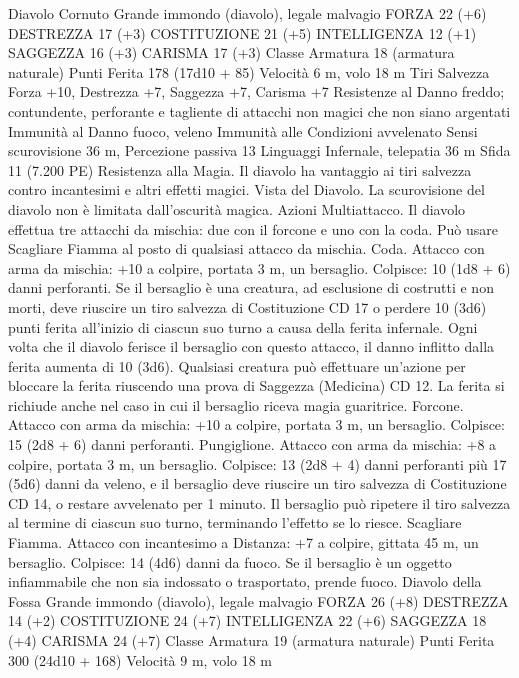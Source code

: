 \begin{multicols}{2}
Diavolo Cornuto
Grande immondo (diavolo), legale malvagio
FORZA 22 (+6)
DESTREZZA 17 (+3)
COSTITUZIONE 21 (+5)
INTELLIGENZA 12 (+1)
SAGGEZZA 16 (+3)
CARISMA 17 (+3)
Classe Armatura 18 (armatura naturale)
Punti Ferita 178 (17d10 + 85)
Velocità 6 m, volo 18 m
Tiri Salvezza Forza +10, Destrezza +7, Saggezza +7, Carisma
+7
Resistenze al Danno freddo; contundente, perforante e tagliente
di attacchi non magici che non siano argentati
Immunità al Danno fuoco, veleno
Immunità alle Condizioni avvelenato
Sensi scurovisione 36 m, Percezione passiva 13
Linguaggi Infernale, telepatia 36 m
Sfida 11 (7.200 PE)
Resistenza alla Magia. Il diavolo ha vantaggio ai tiri salvezza
contro incantesimi e altri effetti magici.
Vista del Diavolo. La scurovisione del diavolo non è limitata
dall’oscurità magica.
Azioni
Multiattacco. Il diavolo effettua tre attacchi da mischia: due con
il forcone e uno con la coda. Può usare Scagliare Fiamma al
posto di qualsiasi attacco da mischia.
Coda. Attacco con arma da mischia: +10 a colpire, portata 3 m,
un bersaglio.
Colpisce: 10 (1d8 + 6) danni perforanti. Se il bersaglio è una
creatura, ad esclusione di costrutti e non morti, deve riuscire un
tiro salvezza di Costituzione CD 17 o perdere 10 (3d6) punti
ferita all’inizio di ciascun suo turno a causa della ferita infernale.
Ogni volta che il diavolo ferisce il bersaglio con questo attacco,
il danno inflitto dalla ferita aumenta di 10 (3d6). Qualsiasi
creatura può effettuare un’azione per bloccare la ferita riuscendo
una prova di Saggezza (Medicina) CD 12. La ferita si richiude
anche nel caso in cui il bersaglio riceva magia guaritrice.
Forcone. Attacco con arma da mischia: +10 a colpire, portata 3
m, un bersaglio.
Colpisce: 15 (2d8 + 6) danni perforanti.
Pungiglione. Attacco con arma da mischia: +8 a colpire, portata
3 m, un bersaglio.
Colpisce: 13 (2d8 + 4) danni perforanti più 17 (5d6) danni da
veleno, e il bersaglio deve riuscire un tiro salvezza di
Costituzione CD 14, o restare avvelenato per 1 minuto. Il
bersaglio può ripetere il tiro salvezza al termine di ciascun suo
turno, terminando l’effetto se lo riesce.
Scagliare Fiamma. Attacco con incantesimo a Distanza: +7 a
colpire, gittata 45 m, un bersaglio.
Colpisce: 14 (4d6) danni da fuoco. Se il bersaglio è un oggetto
infiammabile che non sia indossato o trasportato, prende fuoco.
Diavolo della Fossa
Grande immondo (diavolo), legale malvagio
FORZA 26 (+8)
DESTREZZA 14 (+2)
COSTITUZIONE 24 (+7)
INTELLIGENZA 22 (+6)
SAGGEZZA 18 (+4)
CARISMA 24 (+7)
Classe Armatura 19 (armatura naturale)
Punti Ferita 300 (24d10 + 168)
Velocità 9 m, volo 18 m

\end{multicols}
